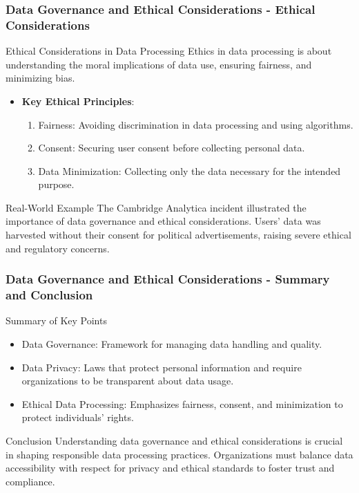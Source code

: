 \documentclass[aspectratio=169]{beamer}
\begin{document}
\begin{frame}[fragile]
    \frametitle{Data Governance and Ethical Considerations - Ethical Considerations}
    \begin{block}{Ethical Considerations in Data Processing}
        Ethics in data processing is about understanding the moral implications of data use, ensuring fairness, and minimizing bias.
    \end{block}
    
    \begin{itemize}
        \item \textbf{Key Ethical Principles}:
        \begin{enumerate}
            \item Fairness: Avoiding discrimination in data processing and using algorithms.
            \item Consent: Securing user consent before collecting personal data.
            \item Data Minimization: Collecting only the data necessary for the intended purpose.
        \end{enumerate}
    \end{itemize}
    
    \begin{block}{Real-World Example}
        The Cambridge Analytica incident illustrated the importance of data governance and ethical considerations. Users' data was harvested without their consent for political advertisements, raising severe ethical and regulatory concerns.
    \end{block}
\end{frame}

\begin{frame}[fragile]
    \frametitle{Data Governance and Ethical Considerations - Summary and Conclusion}
    \begin{block}{Summary of Key Points}
        \begin{itemize}
            \item Data Governance: Framework for managing data handling and quality.
            \item Data Privacy: Laws that protect personal information and require organizations to be transparent about data usage.
            \item Ethical Data Processing: Emphasizes fairness, consent, and minimization to protect individuals' rights.
        \end{itemize}
    \end{block}
    
    \begin{block}{Conclusion}
        Understanding data governance and ethical considerations is crucial in shaping responsible data processing practices. Organizations must balance data accessibility with respect for privacy and ethical standards to foster trust and compliance.
    \end{block}
\end{frame}
\end{document}
